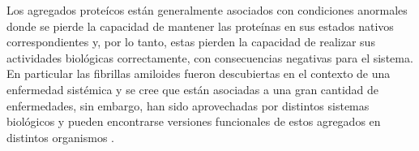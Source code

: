 % 
% 





Los agregados proteícos están generalmente asociados con condiciones anormales donde se pierde la capacidad de mantener las proteínas en sus estados nativos correspondientes 
y, por lo tanto, estas pierden la capacidad de realizar sus actividades biológicas correctamente, con consecuencias negativas para el sistema. 
En particular las fibrillas amiloides fueron descubiertas en el contexto de una enfermedad sistémica y se cree que están asociadas a una gran cantidad de enfermedades, sin embargo,
han sido aprovechadas por distintos sistemas biológicos y pueden encontrarse versiones funcionales de estos agregados en distintos organismos \cite{fowler2007functional}.











